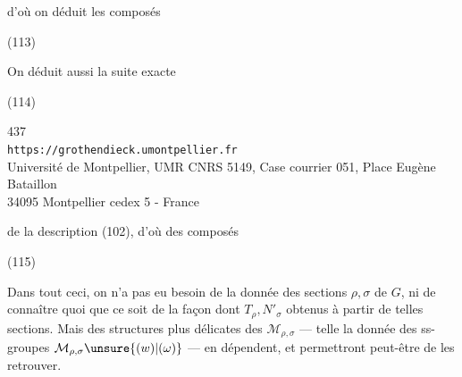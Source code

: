 d'où on déduit les composés

\noindent(113)

On déduit aussi la suite exacte

\noindent(114)


\begin{center}
{\small
437\\
\texttt{https://grothendieck.umontpellier.fr}\\
Université de Montpellier, UMR CNRS 5149, Case courrier 051, Place Eugène Bataillon\\
34095 Montpellier cedex 5 - France
}
\end{center}


de la description (102), d'où des composés

\noindent (115)

Dans tout ceci, on n'a pas eu besoin de la donnée des sections $\rho,\sigma$
de $G$, ni de connaître quoi que ce soit de la façon dont $T_\rho,N'_\sigma$
 obtenus à partir de telles sections.
Mais des structures  plus délicates des
$\mathcal{M}_{\rho,\sigma}$ --- telle la donnée des ss-groupes
 $\mathcal{M}_{\rho,\sigma}\unsure{(w)|(\omega)}$ ---
en dépendent, et permettront peut-être de les retrouver.

